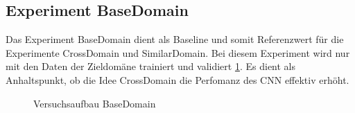 \subsection{Experiment BaseDomain}
\label{methods:v8}
Das Experiment BaseDomain dient als Baseline und somit Referenzwert für die Experimente CrossDomain und SimilarDomain.
Bei diesem Experiment wird nur mit den Daten der Zieldomäne trainiert und validiert \ref{fig:Method_BaseDomain}. Es dient als Anhaltspunkt, ob die Idee CrossDomain die Perfomanz des CNN effektiv erhöht.
\begin{figure}[H]
	\centering
	\caption{Versuchsaufbau BaseDomain}
	\label{fig:Method_BaseDomain}
\end{figure}



